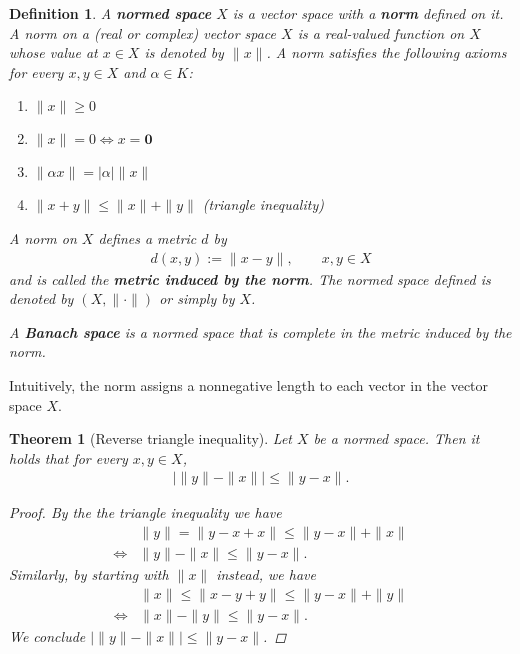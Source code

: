 \documentclass[11pt]{article}
\theoremstyle{mystyle}
\newtheorem{thm}{Theorem}[section]
\newtheorem{defn}{Definition}[section]
\newcommand{\0}{\mathbf{0}}
\begin{document}
\begin{defn}\label{normedbanach}
A \textbf{normed space} $X$ \textit{is a vector space} with a \textbf{norm} defined on it. A norm on a (real or complex) vector space $X$ is a real-valued function on $X$ whose value at $x \in X$ is denoted by $\|x\|$. A norm satisfies the following axioms for every $x, y \in X$ and $\alpha \in K$:
\begin{enumerate}
    \item $\| x \| \geq 0$
    \item $\| x \| = 0 \iff x = \0$
    \item $\| \alpha x \| = |\alpha| \|x\|$
    \item $\| x + y \| \leq \| x \| + \| y \|$ \quad (triangle inequality)
\end{enumerate}

A norm on $X$ defines a metric $d$ by
\begin{align*}
    d(x, y) := \| x - y\|, \qquad x, y \in X
\end{align*}
and is called the \textbf{metric induced by the norm}. The normed space defined is denoted by $(X, \| \cdot \|)$ or simply by $X$.

A \textbf{Banach space} is a normed space that is complete in the metric induced by the norm.
\end{defn}
Intuitively, the norm assigns a nonnegative length to each vector in the vector space $X$.

\begin{thm}[Reverse triangle inequality]\label{reversetriangle}
Let $X$ be a normed space. Then it holds that for every $x, y \in X$,
\begin{align*}
    |\|y\| - \|x\|| \leq \| y - x\|.
\end{align*}
\begin{proof}
By the the triangle inequality we have
\begin{align*}
    &\|y \| = \|y - x + x\| \leq \| y - x\| + \|x\|\\
    \iff&\|y \| - \| x\| \leq \| y - x\|.
\end{align*}
Similarly, by starting with $\|x\|$ instead, we have
\begin{align*}
    &\|x\| \leq \|x- y + y\| \leq \|y - x\| + \|y\|\\
    \iff&\| x\| - \| y \| \leq \|y - x\|.
\end{align*}
We conclude $| \|y\| - \|x\| | \leq \| y-x \|$.
\end{proof}
\end{thm}
\end{document}
